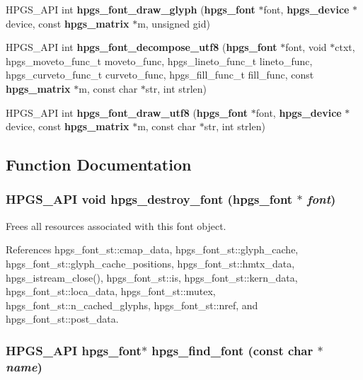 \begin{CompactItemize}
\item 
HPGS\_\-API int {\bf hpgs\_\-font\_\-draw\_\-glyph} ({\bf hpgs\_\-font} $\ast$font, {\bf hpgs\_\-device} $\ast$device, const {\bf hpgs\_\-matrix} $\ast$m, unsigned gid)
\item 
HPGS\_\-API int {\bf hpgs\_\-font\_\-decompose\_\-utf8} ({\bf hpgs\_\-font} $\ast$font, void $\ast$ctxt, hpgs\_\-moveto\_\-func\_\-t moveto\_\-func, hpgs\_\-lineto\_\-func\_\-t lineto\_\-func, hpgs\_\-curveto\_\-func\_\-t curveto\_\-func, hpgs\_\-fill\_\-func\_\-t fill\_\-func, const {\bf hpgs\_\-matrix} $\ast$m, const char $\ast$str, int strlen)
\item 
HPGS\_\-API int {\bf hpgs\_\-font\_\-draw\_\-utf8} ({\bf hpgs\_\-font} $\ast$font, {\bf hpgs\_\-device} $\ast$device, const {\bf hpgs\_\-matrix} $\ast$m, const char $\ast$str, int strlen)
\end{CompactItemize}


\subsection{Function Documentation}
\subsubsection[hpgs\_\-destroy\_\-font]{\setlength{\rightskip}{0pt plus 5cm}HPGS\_\-API void hpgs\_\-destroy\_\-font ({\bf hpgs\_\-font} $\ast$ {\em font})}\label{group__font_g76e917ef915da555fde6409eafb61fbd}


Frees all resources associated with this font object. 

References hpgs\_\-font\_\-st::cmap\_\-data, hpgs\_\-font\_\-st::glyph\_\-cache, hpgs\_\-font\_\-st::glyph\_\-cache\_\-positions, hpgs\_\-font\_\-st::hmtx\_\-data, hpgs\_\-istream\_\-close(), hpgs\_\-font\_\-st::is, hpgs\_\-font\_\-st::kern\_\-data, hpgs\_\-font\_\-st::loca\_\-data, hpgs\_\-font\_\-st::mutex, hpgs\_\-font\_\-st::n\_\-cached\_\-glyphs, hpgs\_\-font\_\-st::nref, and hpgs\_\-font\_\-st::post\_\-data.
\subsubsection[hpgs\_\-find\_\-font]{\setlength{\rightskip}{0pt plus 5cm}HPGS\_\-API {\bf hpgs\_\-font}$\ast$ hpgs\_\-find\_\-font (const char $\ast$ {\em name})}\label{group__font_g54168bad3f8e87d9d36865c6d5387b08}


